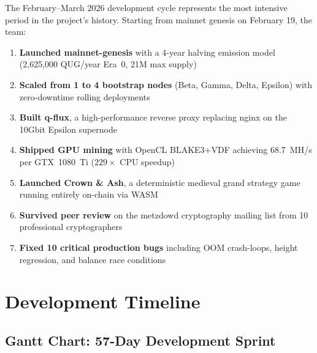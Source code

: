 \documentclass[11pt,a4paper]{article}
\begin{document}
\vspace{0.5cm}

The February--March 2026 development cycle represents the most intensive period in the project's history. Starting from mainnet genesis on February 19, the team:

\begin{enumerate}[leftmargin=*]
    \item \textbf{Launched mainnet-genesis} with a 4-year halving emission model (2,625,000 QUG/year Era~0, 21M max supply)
    \item \textbf{Scaled from 1 to 4 bootstrap nodes} (Beta, Gamma, Delta, Epsilon) with zero-downtime rolling deployments
    \item \textbf{Built q-flux}, a high-performance reverse proxy replacing nginx on the 10Gbit Epsilon supernode
    \item \textbf{Shipped GPU mining} with OpenCL BLAKE3+VDF achieving 68.7~MH/s per GTX~1080~Ti ($229\times$ CPU speedup)
    \item \textbf{Launched Crown \& Ash}, a deterministic medieval grand strategy game running entirely on-chain via WASM
    \item \textbf{Survived peer review} on the metzdowd cryptography mailing list from 10 professional cryptographers
    \item \textbf{Fixed 10 critical production bugs} including OOM crash-loops, height regression, and balance race conditions
\end{enumerate}

\section{Development Timeline}

\subsection{Gantt Chart: 57-Day Development Sprint}
\end{document}
